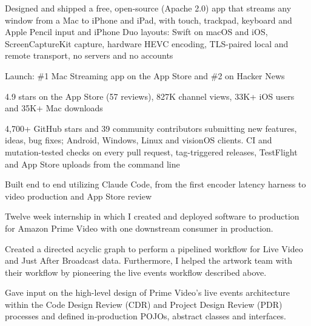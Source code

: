 \documentclass[letterpaper]{deedy-resume} %
\begin{document}
\begin{minipage}[t]{0.66\textwidth}
\begin{tightitemize}
\item Designed and shipped a free, open-source (Apache 2.0) app that streams any window from a Mac to iPhone and iPad, with touch, trackpad, keyboard and Apple Pencil input and iPhone Duo layouts: Swift on macOS and iOS, ScreenCaptureKit capture, hardware HEVC encoding, TLS-paired local and remote transport, no servers and no accounts
\item Launch: \#1 Mac Streaming app on the App Store and \#2 on Hacker News
\item 4.9 stars on the App Store (57 reviews), 827K channel views, 33K+ iOS users and 35K+ Mac downloads
\item 4,700+ GitHub stars and 39 community contributors submitting new features, ideas, bug fixes; Android, Windows, Linux and visionOS clients. CI and mutation-tested checks on every pull request, tag-triggered releases, TestFlight and App Store uploads from the command line
\item Built end to end utilizing Claude Code, from the first encoder latency harness to video production and App Store review
\end{tightitemize}
\vspace{\topsep}


\begin{tightitemize}
\item Twelve week internship in which I created and deployed software to production for Amazon Prime Video with one downstream consumer in production.
\item Created a directed acyclic graph to perform a pipelined workflow for Live Video and Just After Broadcast data. Furthermore, I helped the artwork team with their workflow by pioneering the live events workflow described above.
\item Gave input on the high-level design of Prime Video's live events architecture within the Code Design Review (CDR) and Project Design Review (PDR) processes and defined in-production POJOs, abstract classes and interfaces.
\end{tightitemize}

\end{minipage} %
\end{document}
